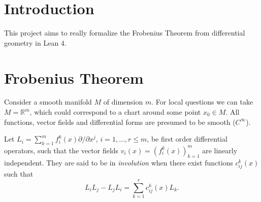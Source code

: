 %

\chapter{Introduction}

This project aims to really formalize the Frobenius Theorem from differential geometry in Lean 4.

\chapter{Frobenius Theorem}

Consider a smooth manifold $M$ of dimension $m$. For local questions we can take
$M=\mathbb{R}^m$, which could correspond to a chart around some point $x_0\in M$.
All functions, vector fields and differential forms are presumed to be smooth ($C^\infty$).

\begin{definition}[involutivity] \label{def:invol}
Let $L_i = \sum_{k=1}^m f_i^k(x) \partial/\partial x^j$, $i=1,\ldots,r\le m$, be
first order differential operators, such that the vector fields $v_i(x) =
(f_i^k(x))_{k=1}^m$ are linearly independent. They are said to be in
\emph{involution} when there exist functions $c^k_{ij}(x)$ such that
\[
  L_i L_j - L_j L_i = \sum_{k=1}^r c^k_{ij}(x) L_k .
\]
\end{definition}

